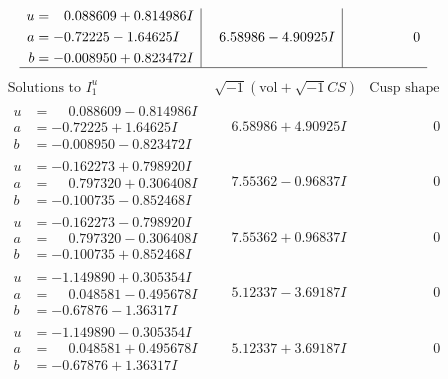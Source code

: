 \documentclass[1p]{elsarticle_modified}
\theoremstyle{definition}
\newcommand{\I}{\sqrt{-1}}
\begin{document}
$$\begin{array}{c|c|c}
\begin{aligned}
u &= \phantom{-}0.088609 + 0.814986 I \\
a &= -0.72225 - 1.64625 I \\
b &= -0.008950 + 0.823472 I\end{aligned}
 & \phantom{-}6.58986 - 4.90925 I & \phantom{-0.000000 } 0\\
 \hline 
 \end{array}$$\newpage$$\begin{array}{c|c|c}  
\text{Solutions to }I^u_{1}& \I (\text{vol} + \sqrt{-1}CS) & \text{Cusp shape}\\
 \hline 
\begin{aligned}
u &= \phantom{-}0.088609 - 0.814986 I \\
a &= -0.72225 + 1.64625 I \\
b &= -0.008950 - 0.823472 I\end{aligned}
 & \phantom{-}6.58986 + 4.90925 I & \phantom{-0.000000 } 0 \\ \hline\begin{aligned}
u &= -0.162273 + 0.798920 I \\
a &= \phantom{-}0.797320 + 0.306408 I \\
b &= -0.100735 - 0.852468 I\end{aligned}
 & \phantom{-}7.55362 - 0.96837 I & \phantom{-0.000000 } 0 \\ \hline\begin{aligned}
u &= -0.162273 - 0.798920 I \\
a &= \phantom{-}0.797320 - 0.306408 I \\
b &= -0.100735 + 0.852468 I\end{aligned}
 & \phantom{-}7.55362 + 0.96837 I & \phantom{-0.000000 } 0 \\ \hline\begin{aligned}
u &= -1.149890 + 0.305354 I \\
a &= \phantom{-}0.048581 - 0.495678 I \\
b &= -0.67876 - 1.36317 I\end{aligned}
 & \phantom{-}5.12337 - 3.69187 I & \phantom{-0.000000 } 0 \\ \hline\begin{aligned}
u &= -1.149890 - 0.305354 I \\
a &= \phantom{-}0.048581 + 0.495678 I \\
b &= -0.67876 + 1.36317 I\end{aligned}
 & \phantom{-}5.12337 + 3.69187 I & \phantom{-0.000000 } 0 \\ \hline\begin{aligned}

\end{aligned}
\end{array}$$
\end{document}

